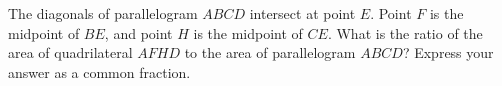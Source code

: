 The diagonals of parallelogram $ABCD$ intersect at point $E$. Point $F$ is the midpoint of $BE$, and point $H$ is the midpoint of $CE$. What is the ratio of the area of quadrilateral $AFHD$ to the area of parallelogram $ABCD$? Express your answer as a common fraction.
